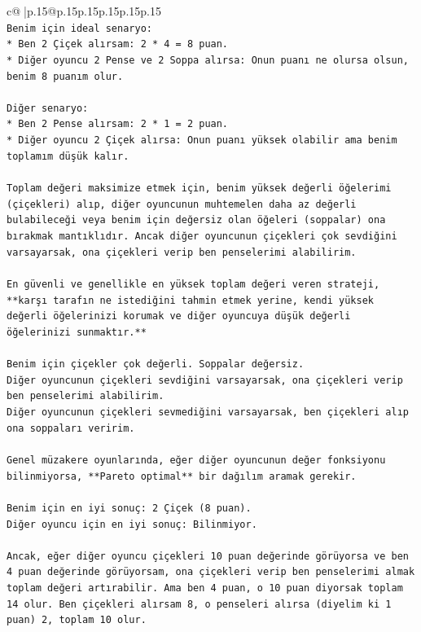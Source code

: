 \documentclass{article}
\begin{document}
{\begin{supertabular}{c@{$\;$}|p{.15\linewidth}@{}p{.15\linewidth}p{.15\linewidth}p{.15\linewidth}p{.15\linewidth}p{.15\linewidth}}
{{{\\ 
\texttt{Benim için ideal senaryo:} \\
\texttt{*   Ben 2 Çiçek alırsam: 2 * 4 = 8 puan.} \\
\texttt{*   Diğer oyuncu 2 Pense ve 2 Soppa alırsa: Onun puanı ne olursa olsun, benim 8 puanım olur.} \\
\\ 
\texttt{Diğer senaryo:} \\
\texttt{*   Ben 2 Pense alırsam: 2 * 1 = 2 puan.} \\
\texttt{*   Diğer oyuncu 2 Çiçek alırsa: Onun puanı yüksek olabilir ama benim toplamım düşük kalır.} \\
\\ 
\texttt{Toplam değeri maksimize etmek için, benim yüksek değerli öğelerimi (çiçekleri) alıp, diğer oyuncunun muhtemelen daha az değerli bulabileceği veya benim için değersiz olan öğeleri (soppalar) ona bırakmak mantıklıdır. Ancak diğer oyuncunun çiçekleri çok sevdiğini varsayarsak, ona çiçekleri verip ben penselerimi alabilirim.} \\
\\ 
\texttt{En güvenli ve genellikle en yüksek toplam değeri veren strateji, **karşı tarafın ne istediğini tahmin etmek yerine, kendi yüksek değerli öğelerinizi korumak ve diğer oyuncuya düşük değerli öğelerinizi sunmaktır.**} \\
\\ 
\texttt{Benim için çiçekler çok değerli. Soppalar değersiz.} \\
\texttt{Diğer oyuncunun çiçekleri sevdiğini varsayarsak, ona çiçekleri verip ben penselerimi alabilirim.} \\
\texttt{Diğer oyuncunun çiçekleri sevmediğini varsayarsak, ben çiçekleri alıp ona soppaları veririm.} \\
\\ 
\texttt{Genel müzakere oyunlarında, eğer diğer oyuncunun değer fonksiyonu bilinmiyorsa, **Pareto optimal** bir dağılım aramak gerekir.} \\
\\ 
\texttt{Benim için en iyi sonuç: 2 Çiçek (8 puan).} \\
\texttt{Diğer oyuncu için en iyi sonuç: Bilinmiyor.} \\
\\ 
\texttt{Ancak, eğer diğer oyuncu çiçekleri 10 puan değerinde görüyorsa ve ben 4 puan değerinde görüyorsam, ona çiçekleri verip ben penselerimi almak toplam değeri artırabilir. Ama ben 4 puan, o 10 puan diyorsak toplam 14 olur. Ben çiçekleri alırsam 8, o penseleri alırsa (diyelim ki 1 puan) 2, toplam 10 olur.} \\
}}}
\end{supertabular}}
\end{document}
